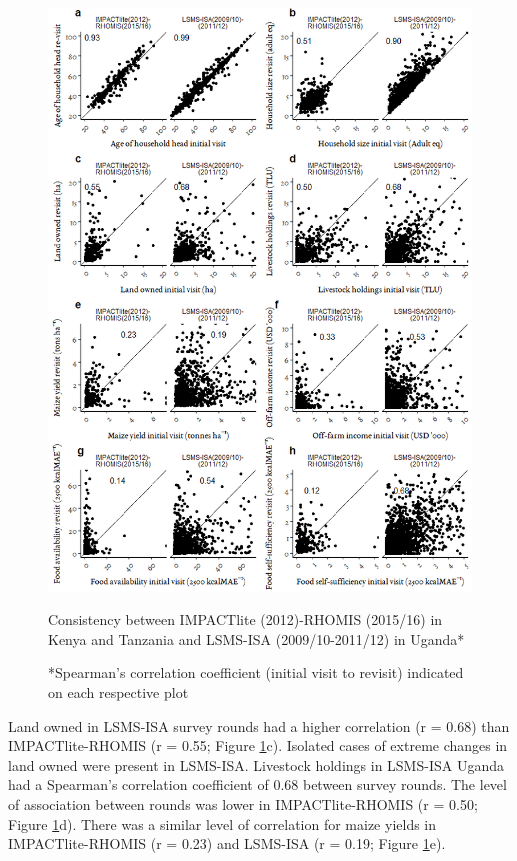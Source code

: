 \begin{figure}
  \includegraphics[width=1\textwidth]{figs_03/image2.png}
  \captionsetup{singlelinecheck = off, justification=justified} %
  \caption{Consistency between IMPACTlite (2012)-RHOMIS (2015/16) in Kenya and Tanzania and LSMS-ISA (2009/10-2011/12) in Uganda*}
  \label{fig:03_2}
  \vspace*{-3mm}
  \caption*{*Spearman's correlation coefficient (initial visit to revisit) indicated on each respective plot}
\end{figure}






Land owned in LSMS-ISA survey rounds had a higher correlation (r = 0.68) than IMPACTlite-RHOMIS (r = 0.55; Figure \ref{fig:03_2}c). Isolated cases of extreme changes in land owned were present in LSMS-ISA. Livestock holdings in LSMS-ISA Uganda had a Spearman's correlation coefficient of 0.68 between survey rounds. The level of association between rounds was lower in IMPACTlite-RHOMIS (r = 0.50; Figure \ref{fig:03_2}d). There was a similar level of correlation for maize yields in IMPACTlite-RHOMIS (r = 0.23) and LSMS-ISA (r = 0.19; Figure \ref{fig:03_2}e).

